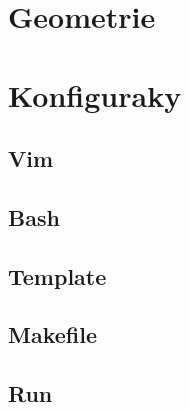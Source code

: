 \documentclass[10pt, a4paper]{article}
\begin{document}
\section{Geometrie}


\section{Konfiguraky}
\subsection{Vim}

\subsection{Bash}

\subsection{Template}

\subsection{Makefile}

\subsection{Run}

\end{document}
